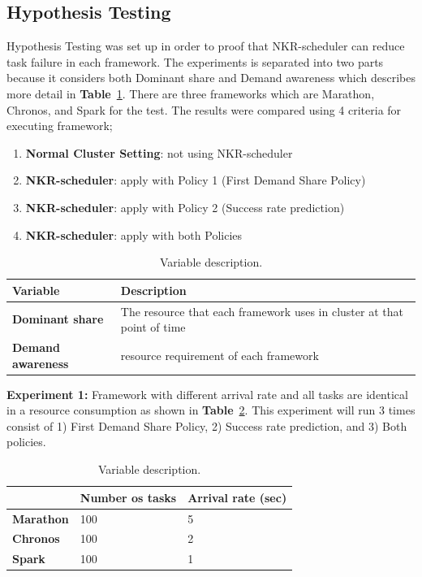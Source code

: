 \documentclass[12pt,oneside,openright,a4paper]{cpe-english-project}
\begin{document}
\subsection{Hypothesis Testing} 
\hspace{10mm}Hypothesis Testing was set up in order to proof that NKR-scheduler can reduce task failure in each framework. The experiments is separated into two parts because it considers both Dominant share and Demand awareness which describes more detail in \textbf{Table}~\ref{tbl:VariableDescription}. There are three frameworks which are Marathon, Chronos, and Spark for the test.  The results were compared using 4 criteria for executing framework;
\begin{enumerate}
  \item \textbf{Normal Cluster Setting}: not using NKR-scheduler 
  \item \textbf{NKR-scheduler}: apply with Policy 1 (First Demand Share Policy)
  \item \textbf{NKR-scheduler}: apply with Policy 2 (Success rate prediction)
  \item \textbf{NKR-scheduler}: apply with both Policies
\end{enumerate}

\begin{table}[!h]
  \caption{Variable description.}\label{tbl:VariableDescription}
  \begin{tabular}{@{}|p{}|p{}|}
    \hline
    \textbf{Variable} & \textbf{Description}\\
    \hline
    \textbf{Dominant share} & The resource that each framework uses in cluster at that point of time\\
    \hline
    \textbf{Demand awareness} & resource requirement of each framework \\
    \hline
  \end{tabular}
\end{table}

\textbf{Experiment 1:} Framework with different arrival rate and all tasks are identical in a resource consumption as shown in \textbf{Table}~\ref{tbl:Experiment1}. This experiment will run 3 times consist of 1) First Demand Share Policy, 2) Success rate prediction, and 3) Both policies.

\begin{table}[!h]
  \caption{Variable description.}\label{tbl:Experiment1}
  \begin{tabular}{@{}|p{}|p{}|p{}|}
    \hline
    & \textbf{Number os tasks} & \textbf{Arrival rate (sec)}\\
    \hline
    \textbf{Marathon} & 100 & 5\\
    \hline
    \textbf{Chronos} & 100 & 2 \\
    \hline
    \textbf{Spark} & 100 & 1 \\
    \hline
\end{tabular}
\end{table}
\end{document}
